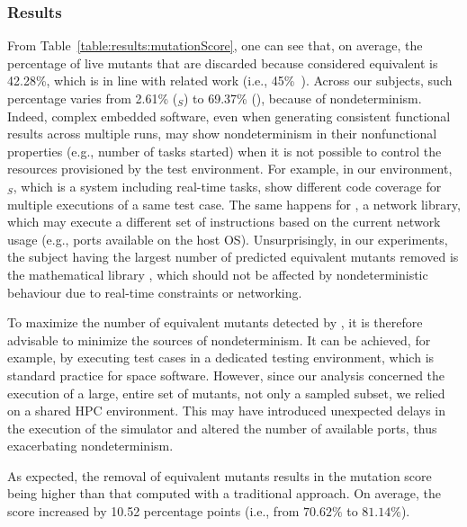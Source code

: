 \subsubsection{Results}
From Table~\ref{table:results:mutationScore}, one can see that, on average, the percentage of live mutants that are discarded because considered equivalent is 42.28\%, which is in line with related work (i.e., 45\%~\cite{zhang2013faster}). Across our subjects, such percentage varies from 2.61\% (\SAIL{}$_S$) to 69.37\% (\MLFS{}{}), because of nondeterminism.
Indeed, complex embedded software, even when generating consistent functional results across multiple runs, may show nondeterminism 
in their nonfunctional properties (e.g., number of tasks started) 
when it is not possible to control the resources provisioned by the test environment.
For example, in our environment, \SAIL{}$_S$, which is a system including real-time tasks, show different code coverage for multiple executions of a same test case. The same happens for \GCSP{}, a network library, which may execute 
a different set of instructions
based on the current network usage (e.g., ports available on the host OS). 
Unsurprisingly, in our experiments, the subject having the largest number of predicted equivalent mutants removed is the mathematical library \MLFS{}{}, which should not be affected by nondeterministic behaviour due to real-time constraints or networking. 

To maximize the number of equivalent mutants detected by \APPR, it is therefore advisable to minimize the sources of nondeterminism. It can be achieved, for example, by executing test cases in a dedicated testing environment, which is standard practice for space software. However, since our analysis concerned the execution of a large, entire set of mutants, not only a sampled subset, we relied on a shared HPC environment. This may have introduced unexpected delays in the execution of the simulator and altered the number of available ports, thus exacerbating nondeterminism.

As expected, the removal of equivalent mutants results in the \APPR mutation score being higher than that computed with a traditional approach. On average, the score increased by 10.52 percentage points (i.e., from $70.62\%$ to $81.14\%$). 

